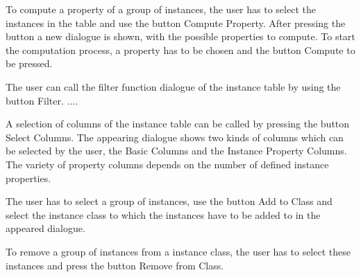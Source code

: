  To compute a property of a group of instances, the user has to select the instances in the table and use the button Compute Property. After pressing the button a new dialogue is shown, with the possible properties to compute. To start the computation process, a property has to be chosen and the button Compute to be pressed.

 The user can call the filter function dialogue of the instance table by using the button Filter. ....

 A selection of columns of the instance table can be called by pressing the button Select Columns. The appearing dialogue shows two kinds of columns which can be selected by the user, the Basic Columns and the Instance Property Columns. The variety of property columns depends on the number of defined instance properties.  

 The user has to select a group of instances, use the button Add to Class and select the instance class to which the instances have to be added to in the appeared dialogue.

 To remove a group of instances from a instance class, the user has to select these instances and press the button Remove from Class.
